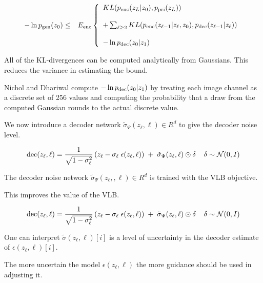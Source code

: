 {

{\huge
  \begin{eqnarray*}
    - \ln p_{\mathrm{gen}}(z_0) & \leq & E_{\mathrm{enc}} \left\{\begin{array}{l}KL(p_{\mathrm{enc}}(z_L|z_0),p_{\mathrm{pri}}(z_L)) \\
\\
+ \sum_{\ell \geq 2} KL(p_{\mathrm{enc}}(z_{\ell-1}|z_\ell,z_0),p_{\mathrm{dec}}(z_{\ell-1}|z_\ell)) \\
\\
- \ln p_{\mathrm{dec}}(z_0|z_1) \end{array} \right.
\end{eqnarray*}
}

All of the KL-divergences can be computed analytically from Gaussians.  This reduces the variance in estimating the bound.

\vfill
Nichol and Dhariwal compute $- \ln p_{\mathrm{dec}}(z_0|z_1)$ by treating each image channel as a discrete set of 256 values and computing the probability that a draw from
the computed Gaussian rounds to the actual discrete value.


We now introduce a decoder network $\tilde{\sigma}_\Psi(z_\ell,\ell) \in R^d$ to give the decoder noise level.

\vfill
$$\mathrm{dec}(z_\ell,\ell) = \frac{1}{\sqrt{1-\sigma_\ell^2}}\left(z_\ell - \sigma_\ell\; \epsilon(z_\ell,\ell)\right)\; +\; \tilde{\sigma}_\Psi(z_\ell,\ell)\odot\delta\;\;\;\;\delta \sim {\cal N}(0,I)$$

\vfill
The decoder noise network $\tilde{\sigma}_\Psi(z_\ell,,\ell) \in R^d$ is trained with the VLB objective.

\vfill
This improves the value of the VLB.


$$\mathrm{dec}(z_\ell,\ell) = \frac{1}{\sqrt{1-\sigma_\ell^2}}\left(z_\ell - \sigma_\ell\; \epsilon(z_\ell,\ell)\right)\; +\; \tilde{\sigma}_\Psi(z_\ell,\ell)\odot\delta\;\;\;\;\delta \sim {\cal N}(0,I)$$

\vfill
One can interpret $\tilde{\sigma}(z_\ell,\ell)[i]$ is a level of uncertainty in the decoder estimate of $\epsilon(z_\ell,\ell)[i]$.

\vfill
The more uncertain the model $\epsilon(z_\ell,\ell)$ the more guidance should be used in adjusting it.


}
